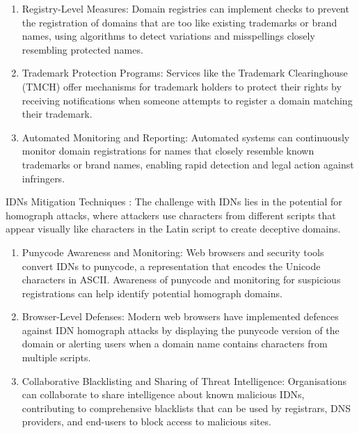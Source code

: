 \begin{enumerate}
  \item Registry-Level Measures: Domain registries can implement checks to prevent the registration of domains that are too like existing trademarks or brand names, using algorithms to detect variations and misspellings closely resembling protected names. \cite{WTR2020} 
  \item Trademark Protection Programs: Services like the Trademark Clearinghouse (TMCH) offer mechanisms for trademark holders to protect their rights by receiving notifications when someone attempts to register a domain matching their trademark. \cite{ICANNTMCH}
  \item Automated Monitoring and Reporting: Automated systems can continuously monitor domain registrations for names that closely resemble known trademarks or brand names, enabling rapid detection and legal action against infringers. \cite{TMCH2023}
\end{enumerate}

IDNs Mitigation Techniques : The challenge with IDNs lies in the potential for homograph attacks, where attackers use characters from different scripts that appear visually like characters in the Latin script to create deceptive domains.

\begin{enumerate}
  \item Punycode Awareness and Monitoring: Web browsers and security tools convert IDNs to punycode, a representation that encodes the Unicode characters in ASCII. Awareness of punycode and monitoring for suspicious registrations can help identify potential homograph domains. \cite{SOCRadar2023}
  \item Browser-Level Defenses: Modern web browsers have implemented defences against IDN homograph attacks by displaying the punycode version of the domain or alerting users when a domain name contains characters from multiple scripts. \cite{Malwarebytes2017}
  \item Collaborative Blacklisting and Sharing of Threat Intelligence: Organisations can collaborate to share intelligence about known malicious IDNs, contributing to comprehensive blacklists that can be used by registrars, DNS providers, and end-users to block access to malicious sites. \cite{CyberThreatAlliance2023}
  
\end{enumerate}

